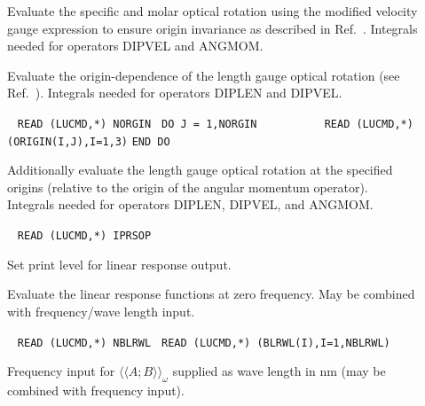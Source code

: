 \begin{description}
\item[] 
Evaluate the specific and molar optical rotation using the modified velocity
gauge
expression to ensure origin invariance as described in
Ref.\ \cite{Pedersen:ORMVE}.
Integrals needed for operators DIPVEL and ANGMOM.

\item[] 
Evaluate the origin-dependence of the length gauge optical rotation
(see Ref.\ \cite{Pedersen:ORMVE}).
Integrals needed for operators DIPLEN and DIPVEL.

\item[] \verb| |\newline
  \verb|READ (LUCMD,*) NORGIN |\newline
  \verb|DO J = 1,NORGIN       |\newline
  \verb|   READ (LUCMD,*) (ORIGIN(I,J),I=1,3)|\newline
  \verb|END DO|

Additionally evaluate the length gauge optical rotation at the
specified origins (relative to the origin of the angular momentum
operator).
Integrals needed for operators DIPLEN, DIPVEL, and ANGMOM.
 
\item[] \verb| |\newline
   \verb|READ (LUCMD,*) IPRSOP|

Set print level for linear response output.

\item[]
Evaluate the linear response functions at zero frequency.
May be combined with frequency/wave length input.

\item[] \verb| |\newline
   \verb|READ (LUCMD,*) NBLRWL |\newline
   \verb|READ (LUCMD,*) (BLRWL(I),I=1,NBLRWL)|

Frequency input for $\langle\langle A;B \rangle\rangle_{\omega}$
supplied as wave length in nm (may be combined with frequency input).
 
\end{description}
